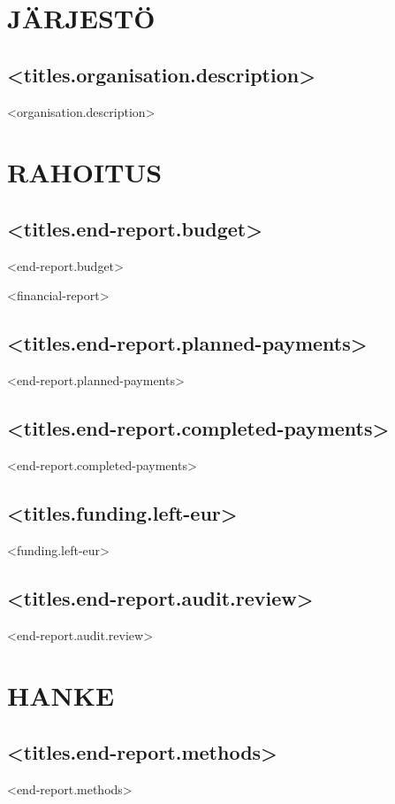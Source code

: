 \documentclass[twoside,a4paper]{article}
\begin{document}
	\restoregeometry
	
	\newpage
	\section{JÄRJESTÖ}
		
		\subsection*{<titles.organisation.description>}
		    <organisation.description>
		
	\newpage		
	\section{RAHOITUS}
		\subsection*{<titles.end-report.budget>}
		    <end-report.budget>
		    
		<financial-report>

		\subsection*{<titles.end-report.planned-payments>}
		    <end-report.planned-payments>
		
		\subsection*{<titles.end-report.completed-payments>}
		    <end-report.completed-payments>
		
		\subsection*{<titles.funding.left-eur>}
		    <funding.left-eur>
		    
		\subsection*{<titles.end-report.audit.review>}
		    <end-report.audit.review>

	\newpage		
	\section{HANKE}
		\subsection*{<titles.end-report.methods>}
		    <end-report.methods>
		
\end{document}
